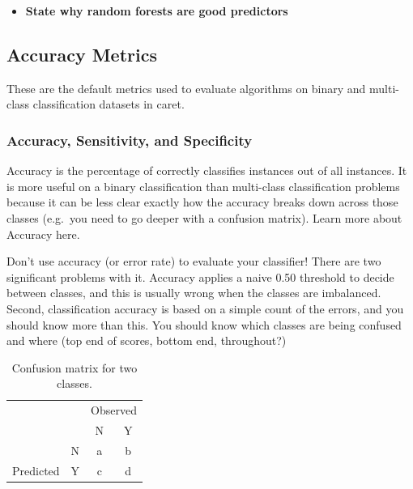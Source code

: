 \documentclass[12pt,]{article}
\providecommand{\tightlist}{%
  \setlength{\itemsep}{0pt}\setlength{\parskip}{0pt}}
\begin{document}
\begin{itemize}
\tightlist
\item
  \textbf{State why random forests are good predictors}
\end{itemize}

\subsection{Accuracy Metrics}\label{accuracy-metrics}

These are the default metrics used to evaluate algorithms on binary and
multi-class classification datasets in caret.

\subsubsection{Accuracy, Sensitivity, and
Specificity}\label{accuracy-sensitivity-and-specificity}

Accuracy is the percentage of correctly classifies instances out of all
instances. It is more useful on a binary classification than multi-class
classification problems because it can be less clear exactly how the
accuracy breaks down across those classes (e.g.~you need to go deeper
with a confusion matrix). Learn more about Accuracy here.

Don't use accuracy (or error rate) to evaluate your classifier! There
are two significant problems with it. Accuracy applies a naive 0.50
threshold to decide between classes, and this is usually wrong when the
classes are imbalanced. Second, classification accuracy is based on a
simple count of the errors, and you should know more than this. You
should know which classes are being confused and where (top end of
scores, bottom end, throughout?)

\begin{table}[!h]

\caption{\label{tab:confusion-matrix}\label{tab:confusion-matrix} Confusion matrix for two classes.}
\centering
\fontsize{12}{14}\selectfont
\begin{tabular}{lc|cc}
\toprule
\multicolumn{2}{c}{ } & \multicolumn{2}{c}{Observed} \\
\cmidrule(l{3pt}r{3pt}){3-4}
  &   & N & Y\\
\midrule
\rowcolor{gray!6}   & N & a & b\\

\multirow{-2}{*}{\raggedright\arraybackslash Predicted} & Y & c & d\\
\bottomrule
\end{tabular}
\end{table}
\end{document}
